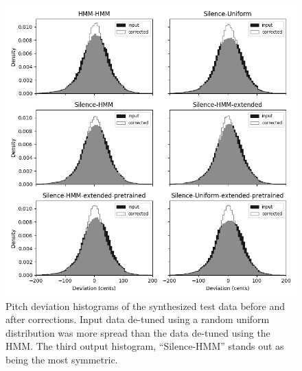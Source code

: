 \begin{figure}[t]
    \centering
    \includegraphics[width=\columnwidth]{figures/test-comparison.png}
    \caption{Pitch deviation histograms of the synthesized test data before and after corrections. Input data de-tuned using a random uniform distribution was more spread than the data de-tuned using the HMM. The third output histogram, ``Silence-HMM'' stands out as being the most symmetric.}
    \label{fig:test-comparison}
\end{figure}

